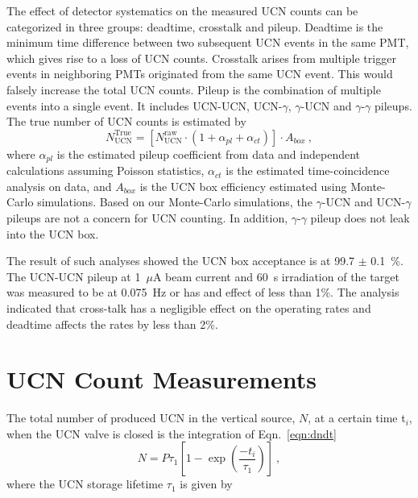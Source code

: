 The effect of detector systematics on the measured UCN counts can be
categorized in three groups: deadtime, crosstalk and pileup. Deadtime
is the minimum time difference between two subsequent UCN events in
the same PMT, which gives rise to a loss of UCN counts. Crosstalk
arises from multiple trigger events in neighboring PMTs originated
from the same UCN event. This would falsely increase the total UCN
counts. Pileup is the combination of multiple events into a single
event. It includes UCN-UCN, UCN-$\gamma$, $\gamma$-UCN and
$\gamma$-$\gamma$ pileups. The true number of UCN counts is estimated
by
\begin{equation}
  \label{eqn:trueUCN}
  N^{\mathrm{True}}_{\mathrm{UCN}} = \left [ N^{\mathrm{raw}}_{\mathrm{UCN}} \cdot \left( 1 + \alpha_{pl} + \alpha_{ct}\right) \right] \cdot A_{box}~,
\end{equation}
where $\alpha_{pl}$ is the estimated pileup coefficient from data and
independent calculations assuming Poisson statistics, $\alpha_{ct}$ is
the estimated time-coincidence analysis on data, and $A_{box}$ is the
UCN box efficiency estimated using Monte-Carlo simulations. Based on
our Monte-Carlo simulations, the $\gamma$-UCN and UCN-$\gamma$ pileups
are not a concern for UCN counting. In addition, $\gamma$-$\gamma$
pileup does not leak into the UCN box.

The result of such analyses showed the UCN box acceptance is at 99.7
$\pm$ 0.1~\%. The UCN-UCN pileup at 1~$\mu$A beam current and 60~s
irradiation of the target was measured to be at 0.075~Hz or has and
effect of less than 1\%. The analysis indicated that cross-talk has a
negligible effect on the operating rates and deadtime affects the
rates by less than 2\%.



\section{UCN Count Measurements \label{UCNCounts}}

The total number of produced UCN in the vertical source, $N$, at a
certain time t$_i$, when the UCN valve is closed is the integration of
Eqn.~\ref{eqn:dndt}
\begin{equation}
  \label{eq:totalUCN}
  N = P \tau_1\left[ 1- \exp \left(\frac{-t_i }{ \tau_1}\right) \right]~,
\end{equation}
where the UCN storage lifetime $\tau_1$ is given by

